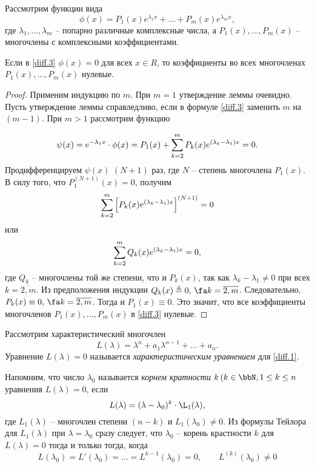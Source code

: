 Рассмотрим функции вида
\begin{equation} \label{diff.3}
\phi(x)=P_1(x)e^{\lambda_1x}+...+P_m(x)e^{\lambda_mx},
\end{equation}
где $\lambda_1,...,\lambda_m$ -- попарно различные комплексные числа, а $P_1(x),...,P_m(x)$ -- многочлены с комплексными коэффициентами.


\begin{lemm}\label{lemm2.2}
Если в \eqref{diff.3} $\phi(x)=0$ для всех $x \in R$, то коэффициенты во всех многочленах $P_1(x),...,P_m(x)$ нулевые.
\end{lemm}


\begin{proof}
Применим индукцию по $m$. При $m=1$ утверждение леммы очевидно. Пусть утверждение леммы справледливо, если в формуле \eqref{diff.3} заменить $m$ на $(m-1)$. При $m>1$ рассмотрим функцию

$$
\psi(x)=e^{-\lambda_1x}\cdot\phi(x)=P_1(x)+ \sum_{k=2}^{m}\limits P_k(x)e^{(\lambda_k-\lambda_1)x}=0.
$$
Продифференцируем $\psi(x)$ $(N+1)$ раз, где $N$ -- степень многочлена $P_1(x)$. В силу того, что $P_1^{(N+1)}(x)=0$, получим 
$$
\sum_{k=2}^{m}\limits\left[P_k(x)e^{(\lambda_k-\lambda_1)x}\right]^{(N+1)}=0
$$
или
$$
\sum_{k=2}^{m}\limits Q_k(x)e^{(\lambda_k-\lambda_1)x}=0,
$$
где $Q_k$ -- многочлены той же степени, что и $P_k(x)$, так как $\lambda_k-\lambda_1 \neq 0$ при всех $k=\overline{2,m}$. Из предположения индукции $Q_k(x)\triangleq 0,\,\fa k=\overline{2,m}$. Следовательно, $P_k(x)\equiv 0,\,\fa k=\overline{2,m}$. Тогда и $P_1(x)\equiv 0$. Это значит, что все коэффициенты многочленов $P_1(x),...,P_m(x)$ в \eqref{diff.3} нулевые.
\end{proof}

Рассмотрим характеристический многочлен
$$
L(\lambda)=\lambda^n+a_1\lambda^{n-1}+...+a_n.
$$
Уравнение $L(\lambda)=0$ называется \textit{характеристическим уравнением} для \eqref{diff.1}.

Напомним, что число $\lambda_0$ называется \textit{корнем кратности} $k\,(k\in\bbN, 1\leq k \leq n$ уравнения $L(\lambda)=0$, если
$$
L(\lambda)=(\lambda-\lambda_0)^k\cdot\L_1(\lambda),
$$
где $L_1(\lambda)$ -- многочлен степени $(n-k)$ и $L_1(\lambda_0)\neq 0$. Из формулы Тейлора для $L_1(\lambda)$ при $\lambda=\lambda_0$ сразу следует, что  $\lambda_0$ -- корень крастности $k$ для $L(\lambda)=0$ тогда и только тогда, когда
$$
L(\lambda_0)=L'(\lambda_0)=...=L^{k-1}(\lambda_0)=0, \qquad L^{(k)}(\lambda_0)\neq 0
$$





